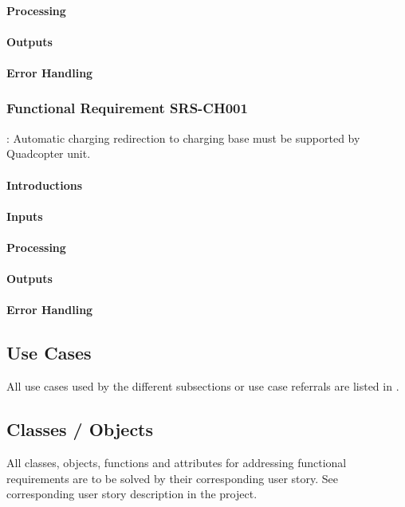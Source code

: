 \documentclass[a4paper]{article}
\begin{document}
\paragraph{Processing}
\paragraph{Outputs}
\paragraph{Error Handling}

\subsubsection{Functional Requirement SRS-CH001}
: Automatic charging redirection to charging base must be supported by Quadcopter unit.
\paragraph{Introductions}
\paragraph{Inputs}
\paragraph{Processing}
\paragraph{Outputs}
\paragraph{Error Handling}



\subsection{Use Cases}
All use cases used by the different subsections or use case referrals are listed in \cite{Dragonfly-UC}.

\subsection{Classes / Objects}
All classes, objects, functions and attributes for addressing functional requirements are to be solved by their corresponding user story. See corresponding user story description in the project.
\end{document}
